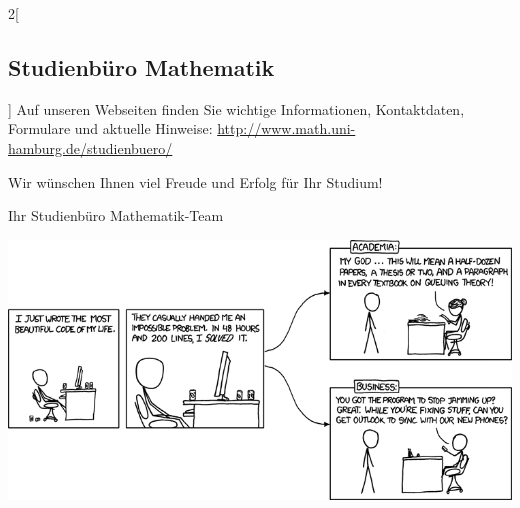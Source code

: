 \begin{multicols}{2}[\subsection{Studienbüro Mathematik}]
Auf unseren Webseiten finden Sie wichtige Informationen, Kontaktdaten,
Formulare und aktuelle Hinweise:
\url{http://www.math.uni-hamburg.de/studienbuero/}

Wir wünschen Ihnen viel Freude und Erfolg für Ihr Studium!

Ihr Studienbüro Mathematik-Team

\begin{center}
\vfill\includegraphics[scale=.5]{comics/664}
\end{center}

\end{multicols}

\clearpage
